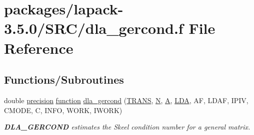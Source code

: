 \hypertarget{dla__gercond_8f}{}\section{packages/lapack-\/3.5.0/\+S\+R\+C/dla\+\_\+gercond.f File Reference}
\label{dla__gercond_8f}
\subsection*{Functions/\+Subroutines}
\begin{DoxyCompactItemize}
\item 
double \hyperlink{numinquire_8h_a2c8e616467665d0b2814d4c1589ba74e}{precision} \hyperlink{afunc_8m_a7b5e596df91eadea6c537c0825e894a7}{function} \hyperlink{group__doubleGEcomputational_ga5539077fbd3a92c4d92b75bf58da5db3}{dla\+\_\+gercond} (\hyperlink{superlu__enum__consts_8h_a0c4e17b2d5cea33f9991ccc6a6678d62a1f61e3015bfe0f0c2c3fda4c5a0cdf58}{T\+R\+A\+N\+S}, \hyperlink{polmisc_8c_a0240ac851181b84ac374872dc5434ee4}{N}, \hyperlink{classA}{A}, \hyperlink{example__user_8c_ae946da542ce0db94dced19b2ecefd1aa}{L\+D\+A}, A\+F, L\+D\+A\+F, I\+P\+I\+V, C\+M\+O\+D\+E, C, I\+N\+F\+O, W\+O\+R\+K, I\+W\+O\+R\+K)
\begin{DoxyCompactList}\small\item\em {\bfseries D\+L\+A\+\_\+\+G\+E\+R\+C\+O\+N\+D} estimates the Skeel condition number for a general matrix. \end{DoxyCompactList}\end{DoxyCompactItemize}
